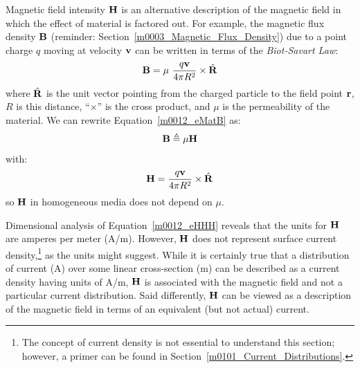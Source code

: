 
 
\label{m0012_Magnetic_Field_Intensity} %

Magnetic field intensity ${\bf H}$ is an alternative description of the magnetic field in which the effect of material is factored out.  
For example, the magnetic flux density ${\bf B}$ (reminder: Section~\ref{m0003_Magnetic_Flux_Density}) due to a point charge $q$ moving at velocity ${\bf v}$ can be written in terms of the \emph{Biot-Savart Law}:
%
\begin{equation}
{\bf B} = \mu ~ \frac{q {\bf v}}{4\pi R^2} \times \hat{\bf R}
\label{m0012_eMatB}
\end{equation}
%
where $\hat{\bf R}$ is the unit vector pointing from the charged particle to the field point ${\bf r}$, $R$ is this distance, ``$\times$'' is the cross product, and
$\mu$ is the permeability of the material.
We can rewrite Equation~\ref{m0012_eMatB} as: 
%
\begin{equation}
{\bf B} \triangleq \mu {\bf H}
\label{m0012_eHDef}
\end{equation}
%
with:
%
\begin{equation}
{\bf H} =  \frac{q {\bf v}}{4\pi R^2} \times \hat{\bf R}
\label{m0012_eHHH}
\end{equation}
%
so ${\bf H}$ in homogeneous media 
does not depend on $\mu$.

Dimensional analysis of Equation~\ref{m0012_eHHH} reveals that the units for ${\bf H}$ are amperes per meter (A/m).  
However, ${\bf H}$ does not represent surface current density,\footnote{The concept of current density is not essential to understand this section; however, a primer can be found in Section~\ref{m0101_Current_Distributions}.} as the units might suggest.  
While it is certainly true that a distribution of current (A) over some linear cross-section (m) can be described as a current density having units of A/m, ${\bf H}$ is associated with the magnetic field and not a particular current distribution.
Said differently, ${\bf H}$ can be viewed as a description of the magnetic field in terms of an equivalent (but not actual) current.

